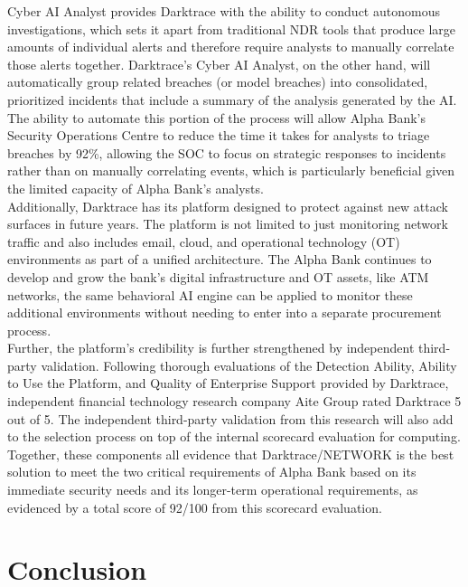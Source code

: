 \documentclass[12pt,a4paper]{report}
\begin{document}
Cyber AI Analyst provides Darktrace with the ability to conduct autonomous investigations, which sets it apart from traditional NDR tools that produce large amounts of individual alerts and therefore require analysts to manually correlate those alerts together. Darktrace's Cyber AI Analyst, on the other hand, will automatically group related breaches (or model breaches) into consolidated, prioritized incidents that include a summary of the analysis generated by the AI. The ability to automate this portion of the process will allow Alpha Bank's Security Operations Centre to reduce the time it takes for analysts to triage breaches by 92\%, allowing the SOC to focus on strategic responses to incidents rather than on manually correlating events, which is particularly beneficial given the limited capacity of Alpha Bank's analysts.\\

Additionally, Darktrace has its platform designed to protect against new attack surfaces in future years. The platform is not limited to just monitoring network traffic and also includes email, cloud, and operational technology (OT) environments as part of a unified architecture. The Alpha Bank continues to develop and grow the bank's digital infrastructure and OT assets, like ATM networks, the same behavioral AI engine can be applied to monitor these additional environments without needing to enter into a separate procurement process.\\

Further, the platform’s credibility is further strengthened by independent third-party validation. Following thorough evaluations of the Detection Ability, Ability to Use the Platform, and Quality of Enterprise Support provided by Darktrace, independent financial technology research company Aite Group rated Darktrace 5 out of 5. The independent third-party validation from this research will also add to the selection process on top of the internal scorecard evaluation for computing.\\

Together, these components all evidence that Darktrace/NETWORK is the best solution to meet the two critical requirements of Alpha Bank based on its immediate security needs and its longer-term operational requirements, as evidenced by a total score of 92/100 from this scorecard evaluation.

\section{Conclusion}
\end{document}
